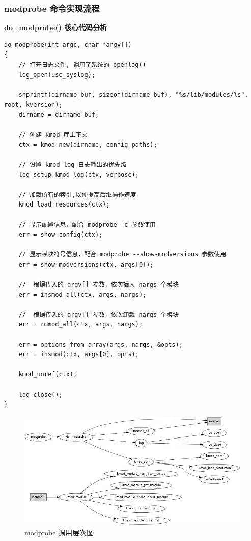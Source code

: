 \documentclass[11pt,a4paper]{article}
\makeatletter
\def\maxwidth{\ifdim\Gin@nat@width>\linewidth\linewidth
\else\Gin@nat@width\fi}
\let\Oldincludegraphics\includegraphics
\renewcommand{\includegraphics}[1]{\Oldincludegraphics[width=\maxwidth]{#1}}
\makeatother
\begin{document}
\subsubsection{modprobe 命令实现流程}

\textbf{do\_modprobe() 核心代码分析}

{\begin{shaded}\begin{verbatim}
do_modprobe(int argc, char *argv[])
{
    // 打开日志文件, 调用了系统的 openlog()
    log_open(use_syslog);

    snprintf(dirname_buf, sizeof(dirname_buf), "%s/lib/modules/%s", root, kversion);
    dirname = dirname_buf;

    // 创建 kmod 库上下文
    ctx = kmod_new(dirname, config_paths);

    // 设置 kmod log 日志输出的优先级
    log_setup_kmod_log(ctx, verbose);

    // 加载所有的索引,以便提高后继操作速度
    kmod_load_resources(ctx);

    // 显示配置信息，配合 modprobe -c 参数使用
    err = show_config(ctx); 

    // 显示模块符号信息，配合 modprobe --show-modversions 参数使用
    err = show_modversions(ctx, args[0]);

    //  根据传入的 argv[] 参数，依次插入 nargs 个模块
    err = insmod_all(ctx, args, nargs);

    //  根据传入的 argv[] 参数，依次卸载 nargs 个模块
    err = rmmod_all(ctx, args, nargs); 

    err = options_from_array(args, nargs, &opts);
    err = insmod(ctx, args[0], opts);

    kmod_unref(ctx);

    log_close();
}
\end{verbatim}\end{shaded}}
\begin{figure}[htbp]
\centering
\includegraphics{./figures/modprobe.jpg}
\caption{modprobe 调用层次图}
\end{figure}
\end{document}
